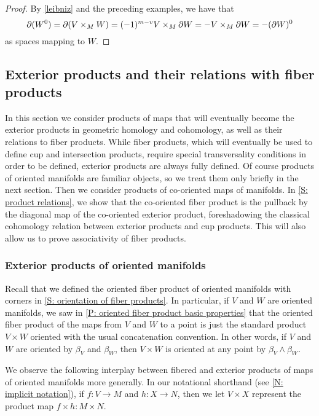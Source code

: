 \begin{proof}
	By \cref{leibniz} and the preceding examples, we have that
	$$\partial (W^0) = \partial (V \times_M W) = (-1)^{m-v} V \times_M \partial W = -V \times_M \partial W = -(\partial W)^0$$
	as spaces mapping to $W$.
\end{proof}

\subsection{Exterior products and their relations with fiber products}\label{S: exterior products}
In this section we consider products of maps that will eventually become the exterior products in geometric homology and cohomology, as well as their relations to fiber products.
While fiber products, which will eventually be used to define cup and intersection products, require special transversality conditions in order to be defined, exterior products are always fully defined.
Of course products of oriented manifolds are familiar objects, so we treat them only briefly in the next section.
Then we consider products of co-oriented maps of manifolds.
In \cref{S: product relations}, we show that the co-oriented fiber product is the pullback by the diagonal map of the co-oriented exterior product, foreshadowing the classical cohomology relation between exterior products and cup products.
This will also allow us to prove associativity of fiber products.

\subsubsection{Exterior products of oriented manifolds}\label{S: oriented product}

Recall that we defined the oriented fiber product of oriented manifolds with corners in \cref{S: orientation of fiber products}.
In particular, if $V$ and $W$ are oriented manifolds, we saw in \cref{P: oriented fiber product basic properties} that the oriented fiber product of the maps from $V$ and $W$ to a point is just the standard product $V \times W$ oriented with the usual concatenation convention.
In other words, if $V$ and $W$ are oriented by $\beta_V$ and $\beta_W$, then $V \times W$ is oriented at any point by $\beta_V \wedge \beta_W$.

We observe the following interplay between fibered and exterior products of maps of oriented manifolds more generally.
In our notational shorthand (see \cref{N: implicit notation}), if $f \colon V \to M$ and $h \colon X \to N$, then we let $V \times X$ represent the product map $f \times h \colon M \times N$.

